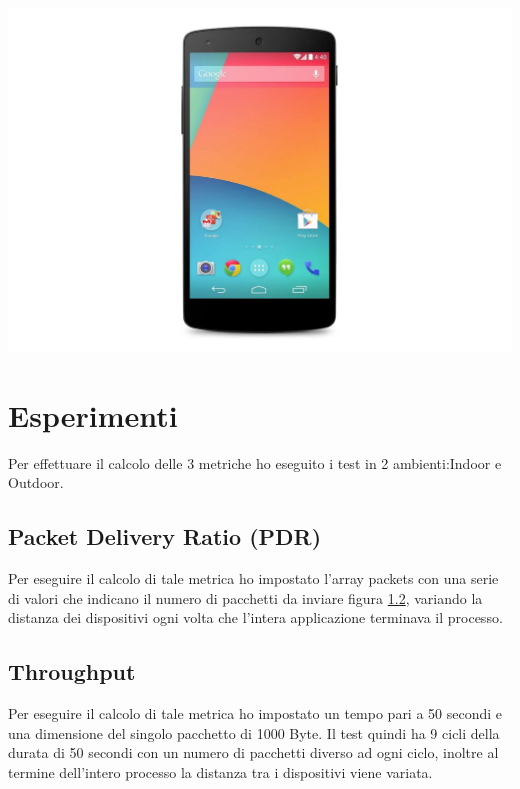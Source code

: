 \begin{center}
\includegraphics[width=1\textwidth]{imgs/nexus5.jpg}
\label{nexus_5_img}%
\end{center}

\section{Esperimenti}
Per effettuare il calcolo delle 3 metriche ho eseguito i test in 2 ambienti:Indoor e Outdoor.

\subsection{Packet Delivery Ratio (PDR)}





Per eseguire il calcolo di tale metrica ho impostato l'array packets con una serie di valori che indicano il numero di pacchetti da inviare figura \ref{}, variando la distanza dei dispositivi ogni volta che l'intera applicazione terminava il processo.

\subsection{Throughput}





Per eseguire il calcolo di tale metrica ho impostato un tempo pari a 50 secondi e una dimensione del singolo pacchetto di 1000 Byte.
Il test quindi ha 9 cicli della durata di 50 secondi con un numero di pacchetti diverso ad ogni ciclo, inoltre al termine dell'intero processo la distanza tra i dispositivi viene variata.

